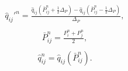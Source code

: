 \documentclass[a4paper,12pt,russian]{extreport}
\begin{document}
    \begin{eqnarray}
        \begin{gathered}
            \hat{q}_{ij}'^n = \frac{\hat{q}_{ij}\left(\bar{P}_{ij}^n+ \frac{1}{2}\Delta_P\right)-
            \hat{q}_{ij}\left(\bar{P}_{ij}^n-\frac{1}{2}\Delta_P\right)}{{\Delta_P}},
        \end{gathered}
    \end{eqnarray}
    \begin{eqnarray}
        \begin{gathered}
            \bar{P}^{n}_{ij} = \frac{P^n_i+P^n_j}{2},
        \end{gathered}
    \end{eqnarray}
    \begin{eqnarray}
        \begin{gathered}
            \hat{q}_{ij}^{n} = \hat{q}_{ij}\left(\bar{P}_{ij}^n\right).
        \end{gathered}
    \end{eqnarray}
\end{document}
